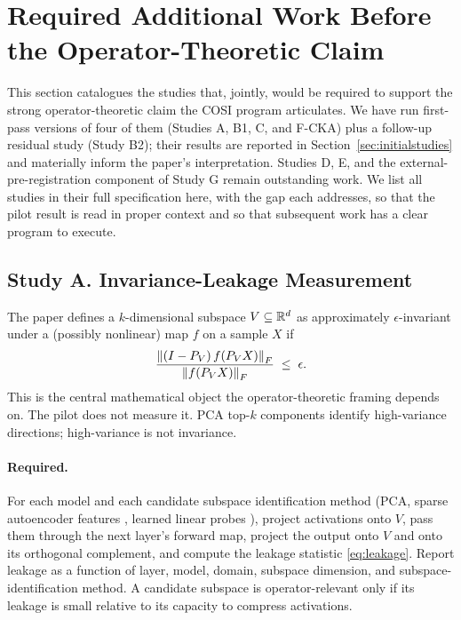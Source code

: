 \section{Required Additional Work Before the Operator-Theoretic Claim}
\label{sec:requiredwork}

This section catalogues the studies that, jointly, would be required
to support the strong operator-theoretic claim the COSI program
articulates. We have run first-pass versions of four of them
(Studies A, B1, C, and F-CKA) plus a follow-up residual study
(Study B2); their results are reported in Section~\ref{sec:initialstudies}
and materially inform the paper's interpretation. Studies D, E, and the
external-pre-registration component of Study G remain outstanding work.
We list all studies in their full specification here, with the gap
each addresses, so that the pilot result is read in proper context and
so that subsequent work has a clear program to execute.

\subsection{Study A. Invariance-Leakage Measurement}
\label{sec:study-a}

The paper defines a $k$-dimensional subspace $V \subseteq \mathbb{R}^d$ as
approximately $\epsilon$-invariant under a (possibly nonlinear) map
$f$ on a sample $X$ if
\begin{equation}
\frac{\left\lVert(I - P_V)\, f(P_V X)\right\rVert_F}{\left\lVert f(P_V X)\right\rVert_F} \;\leq\; \epsilon.
\label{eq:leakage}
\end{equation}
This is the central mathematical object the operator-theoretic framing
depends on. The pilot does not measure it. PCA top-$k$ components
identify high-variance directions; high-variance is not invariance.

\paragraph{Required.} For each model and each candidate subspace
identification method (PCA, sparse autoencoder features
\cite{bricken2023monosemanticity, cunningham2024sparse,
templeton2024scaling, gao2024scaling, lieberum2024gemma}, learned
linear probes \cite{hewitt2019structural, belinkov2022probing}),
project activations onto $V$, pass them through the next layer's
forward map, project the output onto $V$ and onto its orthogonal
complement, and compute the leakage statistic
\eqref{eq:leakage}. Report leakage as a function of layer, model,
domain, subspace dimension, and subspace-identification method. A
candidate subspace is operator-relevant only if its leakage is small
relative to its capacity to compress activations.

